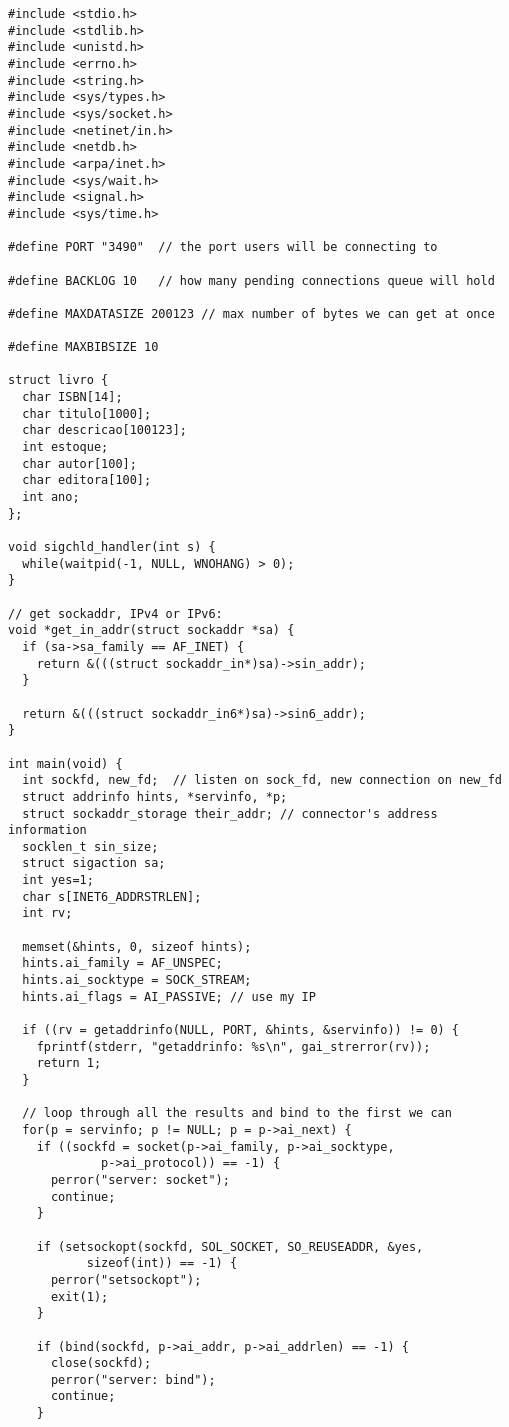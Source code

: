 \documentclass[11pt, brazil]{article} %
\begin{document}
\begin{verbatim}
#include <stdio.h>
#include <stdlib.h>
#include <unistd.h>
#include <errno.h>
#include <string.h>
#include <sys/types.h>
#include <sys/socket.h>
#include <netinet/in.h>
#include <netdb.h>
#include <arpa/inet.h>
#include <sys/wait.h>
#include <signal.h>
#include <sys/time.h>

#define PORT "3490"  // the port users will be connecting to

#define BACKLOG 10	 // how many pending connections queue will hold

#define MAXDATASIZE 200123 // max number of bytes we can get at once

#define MAXBIBSIZE 10

struct livro {
  char ISBN[14];
  char titulo[1000];
  char descricao[100123];
  int estoque;
  char autor[100];
  char editora[100];
  int ano;
};

void sigchld_handler(int s) {
  while(waitpid(-1, NULL, WNOHANG) > 0);
}

// get sockaddr, IPv4 or IPv6:
void *get_in_addr(struct sockaddr *sa) {
  if (sa->sa_family == AF_INET) {
    return &(((struct sockaddr_in*)sa)->sin_addr);
  }

  return &(((struct sockaddr_in6*)sa)->sin6_addr);
}

int main(void) {
  int sockfd, new_fd;  // listen on sock_fd, new connection on new_fd
  struct addrinfo hints, *servinfo, *p;
  struct sockaddr_storage their_addr; // connector's address information
  socklen_t sin_size;
  struct sigaction sa;
  int yes=1;
  char s[INET6_ADDRSTRLEN];
  int rv;

  memset(&hints, 0, sizeof hints);
  hints.ai_family = AF_UNSPEC;
  hints.ai_socktype = SOCK_STREAM;
  hints.ai_flags = AI_PASSIVE; // use my IP

  if ((rv = getaddrinfo(NULL, PORT, &hints, &servinfo)) != 0) {
    fprintf(stderr, "getaddrinfo: %s\n", gai_strerror(rv));
    return 1;
  }

  // loop through all the results and bind to the first we can
  for(p = servinfo; p != NULL; p = p->ai_next) {
    if ((sockfd = socket(p->ai_family, p->ai_socktype,
			 p->ai_protocol)) == -1) {
      perror("server: socket");
      continue;
    }

    if (setsockopt(sockfd, SOL_SOCKET, SO_REUSEADDR, &yes,
		   sizeof(int)) == -1) {
      perror("setsockopt");
      exit(1);
    }

    if (bind(sockfd, p->ai_addr, p->ai_addrlen) == -1) {
      close(sockfd);
      perror("server: bind");
      continue;
    }


\end{verbatim}
\end{document}
